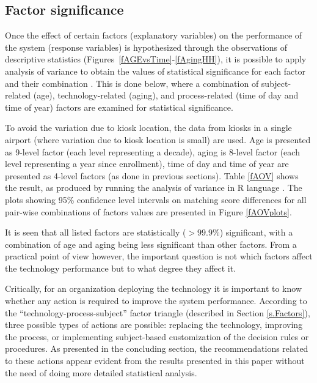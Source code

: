 \documentclass{cta-author}%
\newcommand{\cmt}[1]{}
\begin{document}
\subsection{Factor significance}

Once the effect of certain factors (explanatory variables) on the performance of the system (response variables) is hypothesized through the observations of descriptive statistics (Figures~\ref{fAGEvsTime}-\ref{fAgingHH}), it is possible to apply analysis of variance  to 
obtain the values of statistical significance for each factor and their combination \cite{R-book}.
This is done below, where 
a combination of subject-related (age), technology-related (aging), and process-related (time of day and time of year) factors are examined for statistical significance.
 
To avoid the variation due to kiosk location, the data from kiosks in a single airport (where variation due to kiosk location is small) are used. Age is presented as 9-level factor (each level representing a decade), aging is 8-level  factor (each level representing a year since enrollment), time of day and time of year are presented as 4-level factors (as done in previous sections).
Table \ref{fAOV} shows the result, as produced by running the analysis of variance in R language \cite{R-book}.
The plots showing 95\% \cmt{factor-wise} confidence level intervals on matching score differences for all pair-wise combinations of factors values %
are presented in Figure \ref{fAOVplots}. 


It is seen that all listed factors are statistically ($>99.9\%$) significant, 
with a combination of age and aging being  less significant than other factors. %
From a practical point of view however,
the important question is not which factors affect the technology performance but to what degree they affect it. 

Critically, for an organization  deploying the technology it is important to know  whether any action is required to improve the system performance. 
According to the ``technology-process-subject'' factor triangle (described in Section \ref{s.Factors}), three possible types of actions are possible: 
replacing the technology, improving the process, or implementing subject-based customization of the decision rules or procedures. 
As presented in the concluding section, the recommendations related to these actions appear evident from the results presented in this paper without the need of doing more detailed statistical analysis. 
\end{document}
